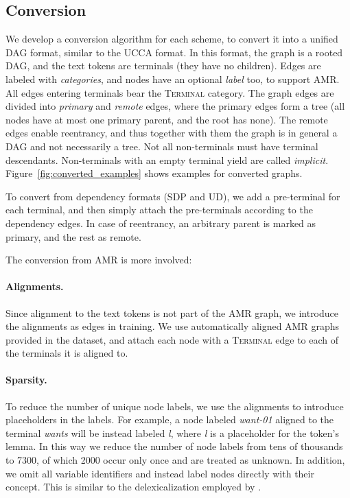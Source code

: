 \documentclass[11pt,a4paper]{article}
\begin{document}
\subsection{Conversion}\label{sec:conversion}

We develop a conversion algorithm for each scheme,
to convert it into a unified DAG format, similar to the UCCA format.
In this format, the graph is a rooted DAG, and the text tokens are terminals
(they have no children).
Edges are labeled with \textit{categories}, and
nodes have an optional \textit{label} too, to support AMR.
All edges entering terminals bear the \textsc{Terminal} category.
The graph edges are divided into \textit{primary} and \textit{remote} edges,
where the primary edges form a tree (all nodes have at most one primary parent,
and the root has none).
The remote edges enable reentrancy, and thus together with them the graph
is in general a DAG and not necessarily a tree.
Not all non-terminals must have terminal descendants.
Non-terminals with an empty terminal yield are called \textit{implicit}.
Figure~\ref{fig:converted_examples} shows examples for converted graphs.

To convert from dependency formats (SDP and UD), we add a pre-terminal for each terminal,
and then simply attach the pre-terminals according to the dependency edges.
In case of reentrancy, an arbitrary parent is marked as primary, and the rest as remote.

The conversion from AMR is more involved:

\paragraph{Alignments.}
Since alignment to the text tokens is not part of the AMR graph,
we introduce the alignments as edges in training.
We use automatically aligned AMR graphs provided in the dataset,
and attach each node with a \textsc{Terminal} edge to each of the terminals it is aligned to.

\paragraph{Sparsity.}
To reduce the number of unique node labels, we use the alignments to introduce
placeholders in the labels.
For example, a node labeled \textit{want-01} aligned to the terminal \textit{wants} will
be instead labeled \textit{\textlangle l},
where \textit{\textlangle l\textrangle} is a placeholder for the token's lemma.
In this way we reduce the number of node labels from tens of thousands to 7300,
of which 2000 occur only once and are treated as unknown.
In addition, we omit all variable identifiers and instead label nodes directly with their concept.
This is similar to the delexicalization employed by \citet{buys2017oxford}.
\end{document}
